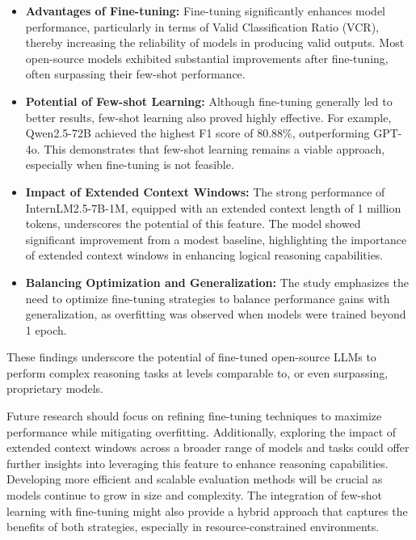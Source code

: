 \documentclass[conference]{IEEEtran}
\begin{document}
\begin{itemize}
    \item \textbf{Advantages of Fine-tuning:} Fine-tuning significantly enhances model performance, particularly in terms of Valid Classification Ratio (VCR), thereby increasing the reliability of models in producing valid outputs. Most open-source models exhibited substantial improvements after fine-tuning, often surpassing their few-shot performance.
    
    \item \textbf{Potential of Few-shot Learning:} Although fine-tuning generally led to better results, few-shot learning also proved highly effective. For example, Qwen2.5-72B achieved the highest F1 score of 80.88\%, outperforming GPT-4o. This demonstrates that few-shot learning remains a viable approach, especially when fine-tuning is not feasible.
    
    \item \textbf{Impact of Extended Context Windows:} The strong performance of InternLM2.5-7B-1M, equipped with an extended context length of 1 million tokens, underscores the potential of this feature. The model showed significant improvement from a modest baseline, highlighting the importance of extended context windows in enhancing logical reasoning capabilities.
    
    \item \textbf{Balancing Optimization and Generalization:} The study emphasizes the need to optimize fine-tuning strategies to balance performance gains with generalization, as overfitting was observed when models were trained beyond 1 epoch.
\end{itemize}

These findings underscore the potential of fine-tuned open-source LLMs to perform complex reasoning tasks at levels comparable to, or even surpassing, proprietary models.

Future research should focus on refining fine-tuning techniques to maximize performance while mitigating overfitting. Additionally, exploring the impact of extended context windows across a broader range of models and tasks could offer further insights into leveraging this feature to enhance reasoning capabilities. Developing more efficient and scalable evaluation methods will be crucial as models continue to grow in size and complexity. The integration of few-shot learning with fine-tuning might also provide a hybrid approach that captures the benefits of both strategies, especially in resource-constrained environments.
\end{document}
